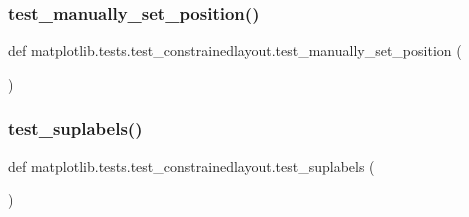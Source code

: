 \subsubsection{\texorpdfstring{test\+\_\+manually\+\_\+set\+\_\+position()}{test\_manually\_set\_position()}}
{\footnotesize\ttfamily def matplotlib.\+tests.\+test\+\_\+constrainedlayout.\+test\+\_\+manually\+\_\+set\+\_\+position (\begin{DoxyParamCaption}{ }\end{DoxyParamCaption})}

\mbox{\label{namespacematplotlib_1_1tests_1_1test__constrainedlayout_a8c3dfd87e290fc9bffe2ae6fda9e366d}} 
\subsubsection{\texorpdfstring{test\+\_\+suplabels()}{test\_suplabels()}}
{\footnotesize\ttfamily def matplotlib.\+tests.\+test\+\_\+constrainedlayout.\+test\+\_\+suplabels (\begin{DoxyParamCaption}{ }\end{DoxyParamCaption})}

